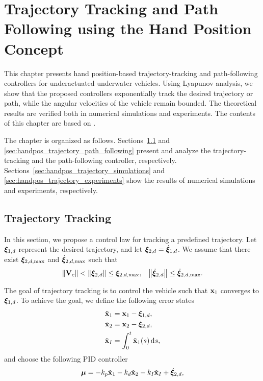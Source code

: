 \chapter{Trajectory Tracking and Path Following using the Hand Position Concept}
\label{chap:handpos_trajectory}

This chapter presents hand position-based trajectory-tracking and path-following controllers for underactuated underwater vehicles.
Using Lyapunov analysis, we show that the proposed controllers exponentially track the desired trajectory or path, while the angular velocities of the vehicle remain bounded.
The theoretical results are verified both in numerical simulations and experiments.
The contents of this chapter are based on \cite{matous_trajectory_2023}.

The chapter is organized as follows.
Sections~\ref{sec:handpos_trajectory_trajectory_tracking} and \ref{sec:handpos_trajectory_path_following} present and analyze the trajectory-tracking and the path-following controller, respectively.
Sections~\ref{sec:handpos_trajectory_simulations} and \ref{sec:handpos_trajectory_experiments} show the results of numerical simulations and experiments, respectively.

\section{Trajectory Tracking}
\label{sec:handpos_trajectory_trajectory_tracking}
In this section, we propose a control law for tracking a predefined trajectory.
Let $\bm{\xi}_{1, d}$ represent the desired trajectory, and let $\bm{\xi}_{2, d} = \dot{\bm{\xi}}_{1, d}$.
We assume that there exist $\bm{\xi}_{2, d, \max}$ and $\dot{\bm{\xi}}_{2, d, \max}$ such that
\begin{align}
    \left\|\mathbf{V}_c\right\| &< \left\|\bm{\xi}_{2, d}\right\| \leq \bm{\xi}_{2, d, \max}, &
    \left\|\dot{\bm{\xi}}_{2, d}\right\| \leq \dot{\bm{\xi}}_{2, d, \max}.
\end{align}

The goal of trajectory tracking is to control the vehicle such that $\mathbf{x}_1$ converges to $\bm{\xi}_{1, d}$.
To achieve the goal, we define the following error states
\begin{subequations}
    \begin{align}
        \tilde{\mathbf{x}}_1 &= \mathbf{x}_1 - \bm{\xi}_{1, d}, \\
        \tilde{\mathbf{x}}_2 &= \mathbf{x}_2 - \bm{\xi}_{2, d}, \\
        \tilde{\mathbf{x}}_I &= \int_{0}^t \tilde{\mathbf{x}}_1(s)\, {\rm d}s,
    \end{align} \label{eq:handpos_trajectory_error_states}
\end{subequations}
and choose the following PID controller
\begin{equation}
    \bm{\mu} = -k_p \tilde{\mathbf{x}}_1 - k_d \tilde{\mathbf{x}}_2 - k_I \tilde{\mathbf{x}}_I + \dot{\bm{\xi}}_{2, d}, \label{eq:handpos_trajectory_external_controller}
\end{equation}

